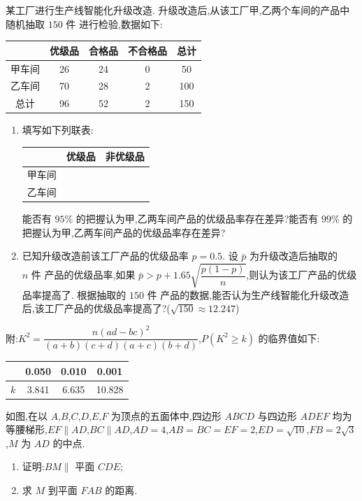 \begin{problem}
某工厂进行生产线智能化升级改造. 升级改造后,从该工厂甲,乙两个车间的产品中随机抽取 \(150\text{ 件}\) 进行检验,数据如下:
\begin{center}
\begin{tabular}{c|ccc|c}
 & 优级品 & 合格品 & 不合格品 & 总计\\ \hline
甲车间 & 26 & 24 & 0 & 50\\
乙车间 & 70 & 28 & 2 & 100\\ \hline
总计 & 96 & 52 & 2 & 150
\end{tabular}
\end{center}
\begin{enumerate}
\item 填写如下列联表:
\begin{center}
\begin{tabular}{c|cc}
 & 优级品 & 非优级品\\ \hline
甲车间 &\fillinblank{} &\fillinblank{} \\
乙车间 &\fillinblank{} &\fillinblank{} \\
\end{tabular}
\end{center}
能否有 \(95\%\) 的把握认为甲,乙两车间产品的优级品率存在差异?能否有 \(99\%\) 的把握认为甲,乙两车间产品的优级品率存在差异?
\item 已知升级改造前该工厂产品的优级品率 \(p=0.5\). 设 \(\bar p\) 为升级改造后抽取的 \(n\text{ 件}\) 产品的优级品率,如果 \(\bar p>p+1.65\sqrt{\dfrac{p(1-p)}n}\),则认为该工厂产品的优级品率提高了. 根据抽取的 \(150\text{ 件}\) 产品的数据,能否认为生产线智能化升级改造后,该工厂产品的优级品率提高了?(\(\sqrt{150}\approx12.247\))
\end{enumerate}
附:\(K^2=\dfrac{n(ad-bc)^2}{(a+b)(c+d)(a+c)(b+d)}\),\(P(K^2\ge k)\) 的临界值如下:
\begin{center}
\begin{tabular}{c|ccc}
 & 0.050 & 0.010 & 0.001\\ \hline
\(k\) & 3.841 & 6.635 & 10.828
\end{tabular}
\end{center}
\end{problem}

\begin{problem}
如图,在以 \(A\),\(B\),\(C\),\(D\),\(E\),\(F\) 为顶点的五面体中,四边形 \(ABCD\) 与四边形 \(ADEF\) 均为等腰梯形,\(EF\parallel AD\),\(BC\parallel AD\),\(AD=4\),\(AB=BC=EF=2\),\(ED=\sqrt{10}\),\(FB=2\sqrt3\),\(M\) 为 \(AD\) 的中点.
\begin{enumerate}
\item 证明:\(BM\parallel\) 平面 \(CDE\);
\item 求 \(M\) 到平面 \(FAB\) 的距离.
\end{enumerate}

\end{problem}

